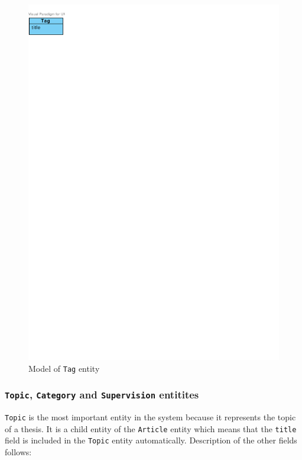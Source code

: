 \begin{figure}[h]
    \centering
        \includegraphics[trim=0 770 510 30, clip, keepaspectratio]{./images/domain-tag-entity.pdf}
    \caption{Model of \texttt{Tag} entity}
    \label{fig:domain-tag-entity}
\end{figure}

\subsubsection{\texttt{Topic}, \texttt{Category} and \texttt{Supervision} entitites}

\texttt{Topic} is the most important entity in the system because it represents the topic of a thesis. It is a child entity of the \texttt{Article} entity which means that the \texttt{title} field is included in the \texttt{Topic} entity automatically. Description of the other fields follows:


